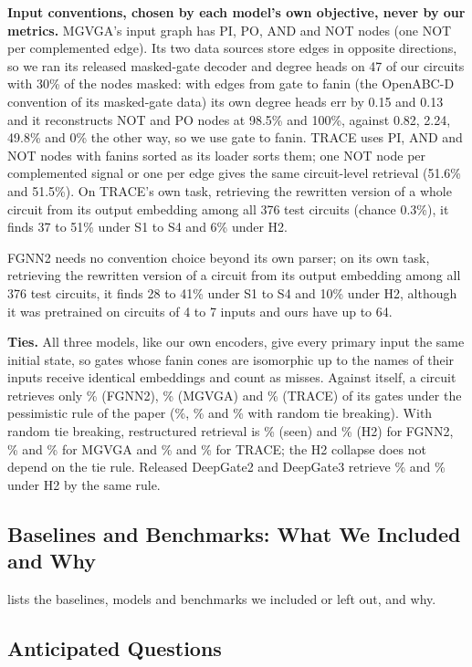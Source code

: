 \noindent\textbf{Input conventions, chosen by each model's own objective, never by our metrics.} MGVGA's input
graph has PI, PO, AND and NOT nodes (one NOT per complemented edge). Its two data sources store edges in opposite
directions, so we ran its released masked-gate decoder and degree heads on 47 of our circuits with 30\% of the
nodes masked: with edges from gate to fanin (the OpenABC-D convention of its masked-gate data) its own degree
heads err by 0.15 and 0.13 and it reconstructs NOT and PO nodes at 98.5\% and 100\%, against 0.82, 2.24, 49.8\%
and 0\% the other way, so we use gate to fanin. TRACE uses PI, AND and NOT nodes with fanins sorted as its loader
sorts them; one NOT node per complemented signal or one per edge gives the same circuit-level retrieval (51.6\%
and 51.5\%). On TRACE's own task, retrieving the rewritten version of a whole circuit from its output embedding
among all 376 test circuits (chance 0.3\%), it finds 37 to 51\% under S1 to S4 and 6\% under H2.

FGNN2 needs no convention choice beyond its own parser; on its own task, retrieving the rewritten version of a
circuit from its output embedding among all 376 test circuits, it finds 28 to 41\% under S1 to S4 and 10\% under H2,
although it was pretrained on circuits of 4 to 7 inputs and ours have up to 64.

\noindent\textbf{Ties.} All three models, like our own encoders, give every primary input the same initial state, so gates whose fanin cones
are isomorphic up to the names of their inputs receive identical embeddings and count as misses. Against itself, a circuit retrieves only \FgSelf\% (FGNN2), \MgSelf\% (MGVGA) and
\TrSelf\% (TRACE) of its gates under the pessimistic rule of the paper (\FgSelfR\%, \MgSelfR\% and \TrSelfR\% with random tie
breaking). With random tie breaking, restructured retrieval is \FgSeenR\% (seen) and \FgHTwoR\% (H2) for FGNN2,
\MgSeenR\% and \MgHTwoR\% for MGVGA and
\TrSeenR\% and \TrHTwoR\% for TRACE; the H2 collapse does not depend on the tie rule. Released DeepGate2 and
DeepGate3 retrieve \DTwoHTwoRS\% and \DThreeHTwoRS\% under H2 by the same rule.

\FloatBarrier
\subsection{Baselines and Benchmarks: What We Included and Why}\label{app:choices}

\noindent {} lists the baselines, models and benchmarks we included or left out, and why.

\FloatBarrier
\subsection{Anticipated Questions}\label{app:faq}

\FloatBarrier
